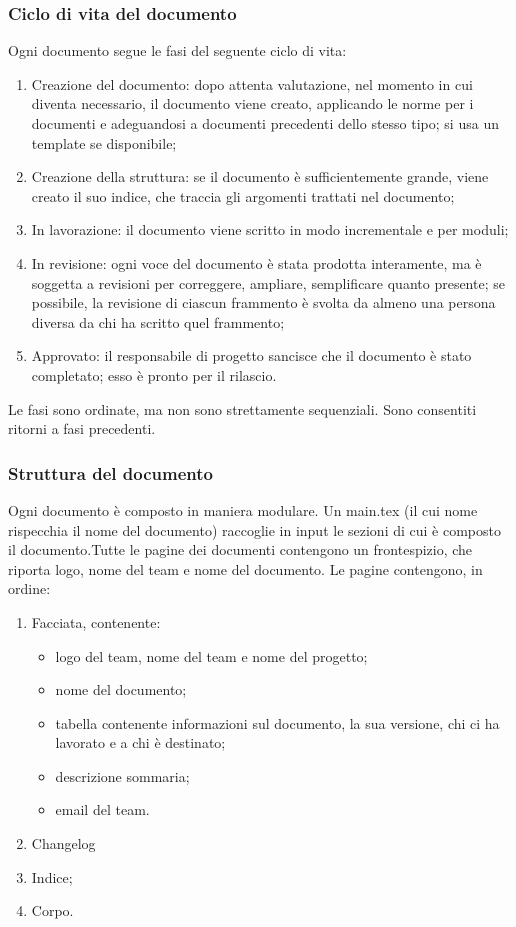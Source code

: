 		\subsubsection{Ciclo di vita del documento}
		Ogni documento segue le fasi del seguente ciclo di vita:
		\begin{enumerate}
			\item Creazione del documento: dopo attenta valutazione, nel momento in cui diventa necessario, il documento viene creato, applicando le norme per i documenti e adeguandosi a documenti precedenti dello stesso tipo; si usa un template se disponibile;
			\item Creazione della struttura: se il documento è sufficientemente grande, viene creato il suo indice, che traccia gli argomenti trattati nel documento;
			\item In lavorazione: il documento viene scritto in modo incrementale e per moduli;
			\item In revisione: ogni voce del documento è stata prodotta interamente, ma è soggetta a revisioni per correggere, ampliare, semplificare quanto presente; se possibile, la revisione di ciascun frammento è svolta da almeno una persona diversa da chi ha scritto quel frammento;
			\item Approvato: il responsabile di progetto sancisce che il documento è stato completato; esso è pronto per il rilascio.
		\end{enumerate}
		Le fasi sono ordinate, ma non sono strettamente sequenziali. Sono consentiti ritorni a fasi precedenti.
		\subsubsection{Struttura del documento}
		Ogni documento è composto in maniera modulare. Un main.tex (il cui nome rispecchia il nome del documento) raccoglie in input le sezioni di cui è composto il documento.\newline Tutte le pagine dei documenti contengono un frontespizio, che riporta logo, nome del team e nome del documento. Le pagine contengono, in ordine:
		\begin{enumerate}
			\item Facciata, contenente:
			\begin{itemize}
				\item logo del team, nome del team e nome del progetto;
				\item nome del documento;
				\item tabella contenente informazioni sul documento, la sua versione, chi ci ha lavorato e a chi è destinato;
				\item descrizione sommaria;
				\item email del team.
			\end{itemize}
			\item Changelog
			\item Indice;
			\item Corpo.
		\end{enumerate}
